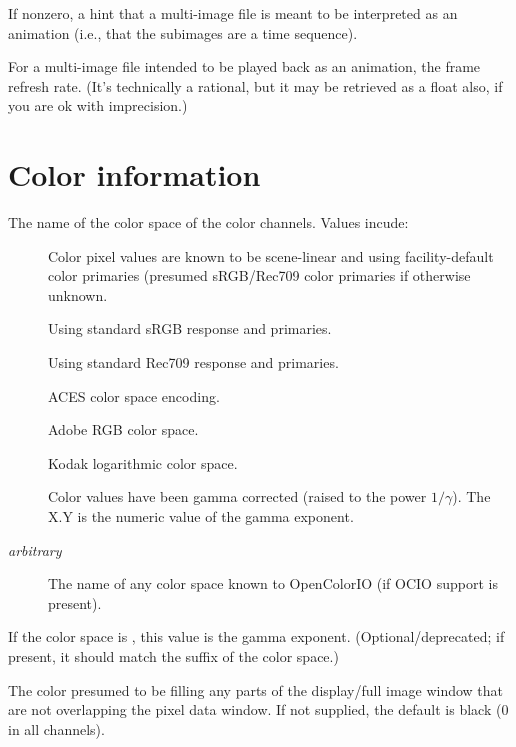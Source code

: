 If nonzero, a hint that a multi-image file is meant to be interpreted as
an animation (i.e., that the subimages are a time sequence).
\apiend

For a multi-image file intended to be played back as an animation,
the frame refresh rate. (It's technically a rational, but it may be retrieved
as a float also, if you are ok with imprecision.)
\apiend

\section{Color information}
\label{metadata:colorspace}

The name of the color space of the color channels.  Values incude:

\begin{description}
\item[\spc] \spc
\item[\halfspc \rm {}] Color pixel values are known to be
  scene-linear and using facility-default color primaries (presumed
  sRGB/Rec709 color primaries if otherwise unknown.
\item[\halfspc \rm {}] Using standard sRGB response and primaries.
\item[\halfspc \rm {}] Using standard Rec709 response and primaries.
\item[\halfspc \rm {}] ACES color space encoding.
\item[\halfspc \rm {}] Adobe RGB color space.
\item[\halfspc \rm {}] Kodak logarithmic color space.
\item[\halfspc \rm {}] Color values have been
  gamma corrected (raised to the power $1/\gamma$). The
  {\cf X.Y} is the numeric value of the gamma exponent.
\item[\halfspc \emph{arbitrary}] The name of any
  color space known to OpenColorIO (if OCIO support is present).
\end{description}
\apiend

If the color space is , this value is the gamma
exponent. (Optional/deprecated; if present, it should match the suffix of the
color space.)
\apiend

The color presumed to be filling any parts of the display/full image
window that are not overlapping the pixel data window.  If not supplied,
the default is black (0 in all channels).
\apiend

